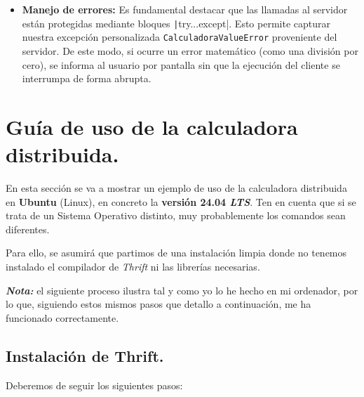 \documentclass[a4paper,12pt]{article}
\begin{document}
\begin{itemize}
			\item \textbf{Manejo de errores:} Es fundamental destacar que las llamadas al servidor están protegidas mediante bloques \texttt|try...except|. Esto permite capturar nuestra excepción personalizada \texttt{CalculadoraValueError} proveniente del servidor. De este modo, si ocurre un error matemático (como una división por cero), se informa al usuario por pantalla sin que la ejecución del cliente se interrumpa de forma abrupta.
		\end{itemize}
		
		\newpage
	
	\section{Guía de uso de la calculadora distribuida.}
		En esta sección se va a mostrar un ejemplo de uso de la calculadora distribuida en \textbf{Ubuntu} (Linux), en concreto la \textbf{versión 24.04 \textit{LTS}}. Ten en cuenta que  si se trata de un Sistema Operativo distinto, muy probablemente los comandos sean diferentes. 
		
		Para ello, se asumirá que partimos de una instalación limpia donde no tenemos instalado el compilador de \textit{Thrift} ni las librerías necesarias.
		
		\textbf{\textit{Nota:}} el siguiente proceso ilustra tal y como yo lo he hecho en mi ordenador, por lo que, siguiendo estos mismos pasos que detallo a continuación, me ha funcionado correctamente. 
		
		\subsection{Instalación de Thrift.}
			Deberemos de seguir los siguientes pasos:
			
\end{document}
